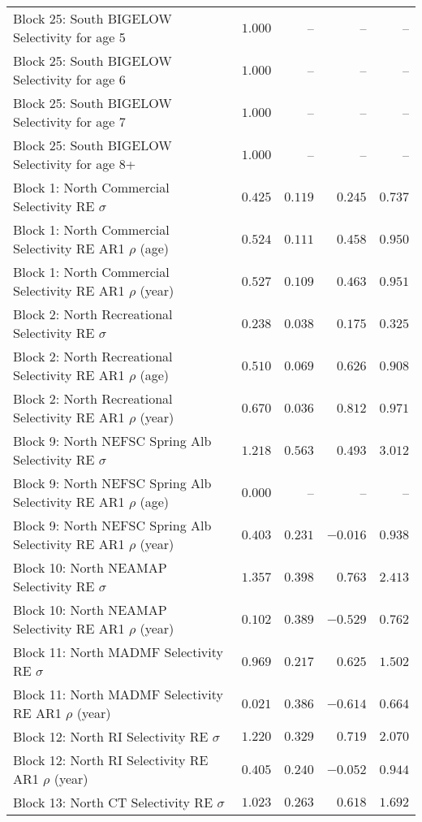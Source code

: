 \documentclass[
]{article}
\begin{document}
\begin{landscape}
\begin{longtable}[t]{lrrrr}
Block 25: South BIGELOW Selectivity for age 5 & $1.000$ & -- & -- & --\\
\addlinespace
Block 25: South BIGELOW Selectivity for age 6 & $1.000$ & -- & -- & --\\
Block 25: South BIGELOW Selectivity for age 7 & $1.000$ & -- & -- & --\\
Block 25: South BIGELOW Selectivity for age 8+ & $1.000$ & -- & -- & --\\
Block 1: North Commercial Selectivity RE $\sigma$ & $0.425$ & $0.119$ & $0.245$ & $0.737$\\
Block 1: North Commercial Selectivity RE AR1 $\rho$ (age) & $0.524$ & $0.111$ & $0.458$ & $0.950$\\
\addlinespace
Block 1: North Commercial Selectivity RE AR1 $\rho$ (year) & $0.527$ & $0.109$ & $0.463$ & $0.951$\\
Block 2: North Recreational Selectivity RE $\sigma$ & $0.238$ & $0.038$ & $0.175$ & $0.325$\\
Block 2: North Recreational Selectivity RE AR1 $\rho$ (age) & $0.510$ & $0.069$ & $0.626$ & $0.908$\\
Block 2: North Recreational Selectivity RE AR1 $\rho$ (year) & $0.670$ & $0.036$ & $0.812$ & $0.971$\\
Block 9: North NEFSC Spring Alb Selectivity RE $\sigma$ & $1.218$ & $0.563$ & $0.493$ & $3.012$\\
\addlinespace
Block 9: North NEFSC Spring Alb Selectivity RE AR1 $\rho$ (age) & $0.000$ & -- & -- & --\\
Block 9: North NEFSC Spring Alb Selectivity RE AR1 $\rho$ (year) & $0.403$ & $0.231$ & $-0.016$ & $0.938$\\
Block 10: North NEAMAP Selectivity RE $\sigma$ & $1.357$ & $0.398$ & $0.763$ & $2.413$\\
Block 10: North NEAMAP Selectivity RE AR1 $\rho$ (year) & $0.102$ & $0.389$ & $-0.529$ & $0.762$\\
Block 11: North MADMF Selectivity RE $\sigma$ & $0.969$ & $0.217$ & $0.625$ & $1.502$\\
\addlinespace
Block 11: North MADMF Selectivity RE AR1 $\rho$ (year) & $0.021$ & $0.386$ & $-0.614$ & $0.664$\\
Block 12: North RI Selectivity RE $\sigma$ & $1.220$ & $0.329$ & $0.719$ & $2.070$\\
Block 12: North RI Selectivity RE AR1 $\rho$ (year) & $0.405$ & $0.240$ & $-0.052$ & $0.944$\\
Block 13: North CT Selectivity RE $\sigma$ & $1.023$ & $0.263$ & $0.618$ & $1.692$\\

\end{longtable}
\end{landscape}
\end{document}
